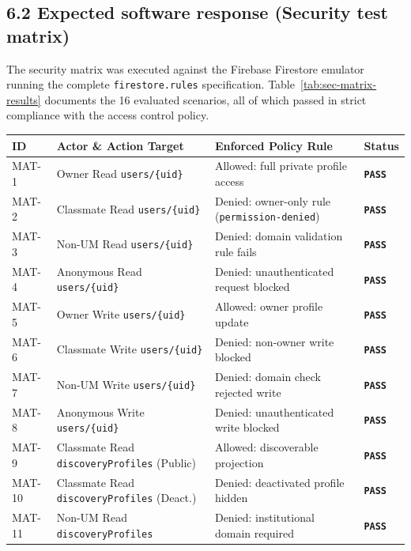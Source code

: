 \documentclass[11pt,letterpaper]{article}
\begin{document}
\subsection*{6.2 Expected software response (Security test matrix)}

The security matrix was executed against the Firebase Firestore emulator running the complete \texttt{firestore.rules} specification. Table~\ref{tab:sec-matrix-results} documents the 16 evaluated scenarios, all of which passed in strict compliance with the access control policy.

\begin{table}[h!]
\centering
\small
\begin{tabularx}{\textwidth}{p{1.4cm} L{5.8cm} L{4.5cm} p{1.6cm}}
\toprule
\textbf{ID} & \textbf{Actor \& Action Target} & \textbf{Enforced Policy Rule} & \textbf{Status} \\
\midrule
MAT-1 & Owner Read \texttt{users/\{uid\}} & Allowed: full private profile access & \textbf{\texttt{PASS}} \\
MAT-2 & Classmate Read \texttt{users/\{uid\}} & Denied: owner-only rule (\texttt{permission-denied}) & \textbf{\texttt{PASS}} \\
MAT-3 & Non-UM Read \texttt{users/\{uid\}} & Denied: domain validation rule fails & \textbf{\texttt{PASS}} \\
MAT-4 & Anonymous Read \texttt{users/\{uid\}} & Denied: unauthenticated request blocked & \textbf{\texttt{PASS}} \\
MAT-5 & Owner Write \texttt{users/\{uid\}} & Allowed: owner profile update & \textbf{\texttt{PASS}} \\
MAT-6 & Classmate Write \texttt{users/\{uid\}} & Denied: non-owner write blocked & \textbf{\texttt{PASS}} \\
MAT-7 & Non-UM Write \texttt{users/\{uid\}} & Denied: domain check rejected write & \textbf{\texttt{PASS}} \\
MAT-8 & Anonymous Write \texttt{users/\{uid\}} & Denied: unauthenticated write blocked & \textbf{\texttt{PASS}} \\
MAT-9 & Classmate Read \texttt{discoveryProfiles} (Public) & Allowed: discoverable projection & \textbf{\texttt{PASS}} \\
MAT-10 & Classmate Read \texttt{discoveryProfiles} (Deact.) & Denied: deactivated profile hidden & \textbf{\texttt{PASS}} \\
MAT-11 & Non-UM Read \texttt{discoveryProfiles} & Denied: institutional domain required & \textbf{\texttt{PASS}} \\

\end{tabularx}
\end{table}
\end{document}
